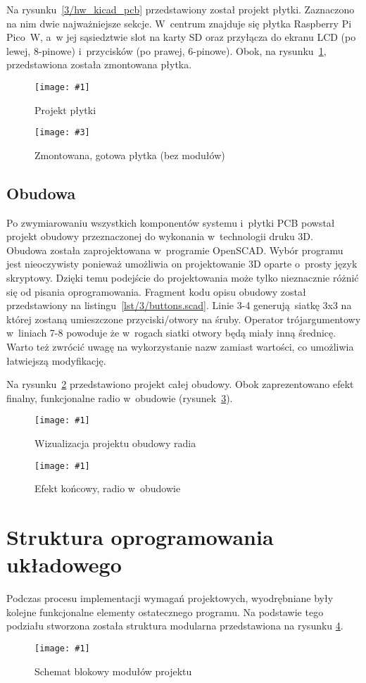 \documentclass[polish]{aghengthesis}
\newcommand{\imgint}[4]{
	\begin{figure}[{#4}]
		\centering
		\texttt{[image: \#1]}
		\caption{#2}
		\label{#1}
	\end{figure}
}
\newcommand{\imgh}[3]{\imgint{#1}{#2}{#3}{H}}
\newcommand{\imgintss}[5]{
	\begin{figure}[{#5}]
		\centering
		\begin{minipage}{.45\textwidth}
			\centering
			\texttt{[image: \#1]}
			\caption{#2}
			\label{#1}
		\end{minipage}%
		\hfill
		\begin{minipage}{.45\textwidth}
			\centering
			\texttt{[image: \#3]}
			\caption{#4}
			\label{#3}
		\end{minipage}
	\end{figure}
}
\newcommand{\imghss}[4]{\imgintss{#1}{#2}{#3}{#4}{H}}
\newcommand{\lstfile}[3]{
	\noindent
	\hspace{0.1\linewidth}
	\begin{minipage}{0.8\linewidth}
		
	\end{minipage}
	\vspace{0.3cm}
}
\begin{document}
			Na rysunku~\ref{3/hw_kicad_pcb} przedstawiony został projekt płytki. Zaznaczono na nim dwie najważniejsze sekcje. W~centrum znajduje się płytka Raspberry Pi Pico~W, a~w jej sąsiedztwie slot na karty SD oraz przyłącza do ekranu LCD (po lewej, 8-pinowe) i~przycisków (po prawej, 6-pinowe). Obok, na rysunku~\ref{3/hw_pcb}, przedstawiona została zmontowana płytka.
			
			\imghss{3/hw_kicad_pcb}{Projekt płytki}{3/hw_pcb}{Zmontowana, gotowa płytka (bez modułów)}
			
		\subsection{Obudowa}
			Po zwymiarowaniu wszystkich komponentów systemu i~płytki PCB powstał projekt obudowy przeznaczonej do wykonania w~technologii druku 3D.
			$ $\\
			
			Obudowa została zaprojektowana w~programie OpenSCAD\textsuperscript{\cite{hw_openscad}}. Wybór programu jest nieoczywisty ponieważ umożliwia on projektowanie 3D oparte o~prosty język skryptowy. Dzięki temu podejście do projektowania może tylko nieznacznie różnić się od pisania oprogramowania. Fragment kodu opisu obudowy został przedstawiony na listingu~\ref{lst/3/buttons.scad}. Linie 3-4 generują siatkę 3x3 na której zostaną umieszczone przyciski/otwory na śruby. Operator trójargumentowy w~liniach 7-8 powoduje że w~rogach siatki otwory będą miały inną średnicę. Warto też zwrócić uwagę na wykorzystanie nazw zamiast wartości, co umożliwia łatwiejszą modyfikację.
			
			\lstfile{scad}{Kod generujący otwory na przyciski i~śruby montażowe}{lst/3/buttons.scad}
			\pagebreak
			
			Na rysunku~\ref{3/hw_scad_case} przedstawiono projekt całej obudowy. Obok zaprezentowano efekt finalny, funkcjonalne radio w~obudowie (rysunek~\ref{3/hw_case}).
			\imgh{3/hw_scad_case}{Wizualizacja projektu obudowy radia}{0.8}
			\imgh{3/hw_case}{Efekt końcowy, radio w~obudowie}{0.8}
			\pagebreak
	
	\section{Struktura oprogramowania układowego}
		Podczas procesu implementacji wymagań projektowych, wyodrębniane były kolejne funkcjonalne elementy ostatecznego programu.
		Na podstawie tego podziału stworzona została struktura modularna przedstawiona na rysunku \ref{3/PicoRadio-code-block-diagram}.
		\imgh{3/PicoRadio-code-block-diagram}{Schemat blokowy modułów projektu}{0.75}
		
\end{document}
